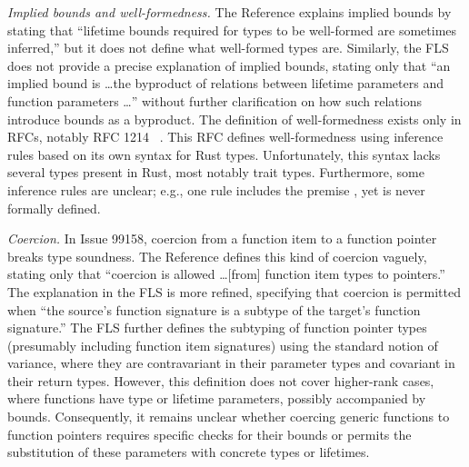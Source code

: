 {\it Implied bounds and well-formedness.}
%
The Reference explains implied bounds by stating that ``lifetime bounds required
for types to be well-formed are sometimes inferred,'' but it does not define
what well-formed types are.
%
Similarly, the FLS does not provide a precise explanation of implied bounds,
stating only that ``an implied bound is \ldots the byproduct of relations
between lifetime parameters and function parameters \ldots'' without further
clarification on how such relations introduce bounds as a byproduct.
%
The definition of well-formedness exists only in RFCs, notably RFC 1214
~\cite{rfc1214}.
%
This RFC defines well-formedness using inference rules based on its own syntax
for Rust types.
%
Unfortunately, this syntax lacks several types present in Rust, most notably
 trait types.
%
Furthermore, some inference rules are unclear;
%
e.g., one rule includes the premise , yet  is never
formally defined.

%
%

{\it Coercion.}
%
In Issue 99158, coercion from a function item to a function pointer breaks type
soundness.
%
The Reference defines this kind of coercion vaguely, stating only that
%
``coercion is allowed \ldots [from] function item types to  pointers.''
%
%
The explanation in the FLS is more refined, specifying that coercion is
permitted when
%
``the source's function signature is a subtype of the target's function
signature.''
%
The FLS further defines the subtyping of function pointer types (presumably
including function item signatures) using the standard notion of variance, where
they are contravariant in their parameter types and covariant in their return
types.
%
However, this definition does not cover higher-rank cases, where functions have
type or lifetime parameters, possibly accompanied by bounds.
%
Consequently, it remains unclear whether coercing generic functions to function
pointers requires specific checks for their bounds or permits the substitution
of these parameters with concrete types or lifetimes.

